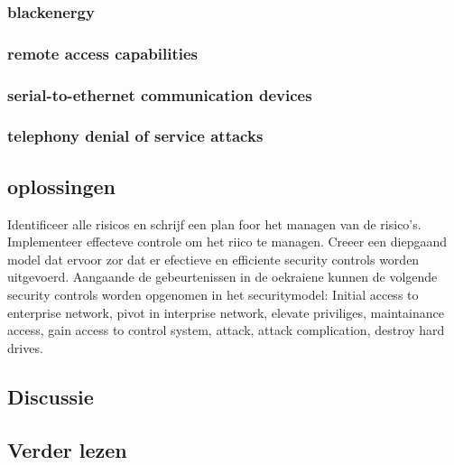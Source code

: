 \subsubsection{blackenergy}
\subsubsection{remote access capabilities}
\subsubsection{serial-to-ethernet communication devices}
\subsubsection{telephony denial of service attacks}

\subsection{oplossingen}
Identificeer alle risicos en schrijf een plan foor het managen van de risico's.
Implementeer  effecteve controle  om het riico te managen.
Creeer een diepgaand model dat ervoor zor dat er efectieve en efficiente security controls worden uitgevoerd.
Aangaande de gebeurtenissen in de oekraiene kunnen de volgende security controls worden opgenomen in het securitymodel: Initial access to enterprise network, pivot in interprise network, elevate priviliges, maintainance access, gain access to control system, attack, attack complication, destroy hard drives.
\cite{Whitehead2017ukrainepoweroutage}

\subsection{Discussie}

\subsection{Verder lezen}


\cite{Shahzad2014ScadaProtocolsPollingScenario}
\cite{grammatikis2019AttackIEC6087505104}
\cite{2017win32industroyer}
\cite{yadav2020reviewScadaArchitecture}
\cite{arrizabalaga2020surveyiiotProtocols}
\cite{fauri2017EncryptionICS}
\cite{resch31102019IEC62351secureCommunication}
\cite{levalle2020FuzzingICSProtocols}
\cite{blackhatusa2017}
\cite{blackhatusa2017}
\cite{abb30062017crashoverridenotification}
\cite{spinner2018crashoverrideiot} 
\cite{njccicthreat08102017crashovverrideprofile}
\cite{slowikvb2018crashoverride}
\cite{crashoverridenetwork}
\cite{wikiindustroyer}
\cite{icsSecurityRussianHacking}
\cite{holappa2017threattoElectricityNetworks}
